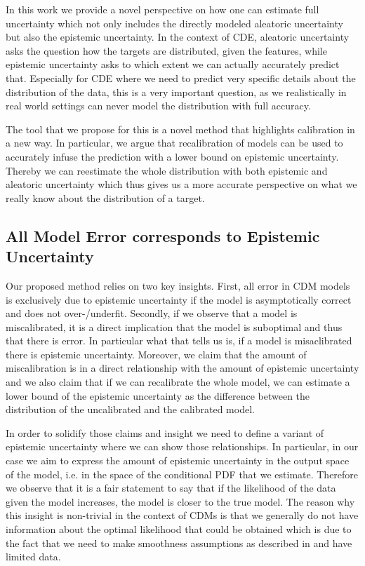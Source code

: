 In this work we provide a novel perspective on how one can estimate full uncertainty which not only includes the directly modeled aleatoric uncertainty but also the epistemic uncertainty. In the context of CDE, aleatoric uncertainty asks the question how the targets are distributed, given the features, while epistemic uncertainty asks to which extent we can actually accurately predict that. Especially for CDE where we need to predict very specific details about the distribution of the data, this is a very important question, as we realistically in real world settings can never model the distribution with full accuracy.

The tool that we propose for this is a novel method that highlights calibration in a new way. In particular, we argue that recalibration of models can be used to accurately infuse the prediction with a lower bound on epistemic uncertainty. Thereby we can reestimate the whole distribution with both epistemic and aleatoric uncertainty which thus gives us a more accurate perspective on what we really know about the distribution of a target.

\subsection{All Model Error corresponds to Epistemic Uncertainty}\label{sec:uncertainty_calibration_connection}

Our proposed method relies on two key insights. First, all error in CDM models is exclusively due to epistemic uncertainty if the model is asymptotically correct and does not over-/underfit. Secondly, if we observe that a model is miscalibrated, it is a direct implication that the model is suboptimal and thus that there is error. In particular what that tells us is, if a model is misaclibrated there is epistemic uncertainty. Moreover, we claim that the amount of miscalibration is in a direct relationship with the amount of epistemic uncertainty and we also claim that if we can recalibrate the whole model, we can estimate a lower bound of the epistemic uncertainty as the difference between the distribution of the uncalibrated and the calibrated model.

In order to solidify those claims and insight we need to define a variant of epistemic uncertainty where we can show those relationships. In particular, in our case we aim to express the amount of epistemic uncertainty in the output space of the model, i.e. in the space of the conditional PDF that we estimate. Therefore we observe that it is a fair statement to say that if the likelihood of the data given the model increases, the model is closer to the true model. The reason why this insight is non-trivial in the context of CDMs is that we generally do not have information about the optimal likelihood that could be obtained which is due to the fact that we need to make smoothness assumptions as described in  and have limited data.

